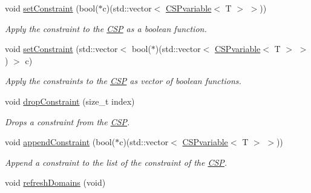 \begin{DoxyCompactItemize}
void \hyperlink{classCSP_a534a0d9bd10fb544f94196bf3c386657}{setConstraint} (bool($\ast$c)(std::vector$<$ \hyperlink{structCSPvariable}{CSPvariable}$<$ T $>$ $>$))
\begin{DoxyCompactList}\small\item\em Apply the constraint to the \hyperlink{classCSP}{CSP} as a boolean function. \item\end{DoxyCompactList}\item 
void \hyperlink{classCSP_a457e1df05d4ec16be00118bda22fd882}{setConstraint} (std::vector$<$ bool($\ast$)(std::vector$<$ \hyperlink{structCSPvariable}{CSPvariable}$<$ T $>$ $>$) $>$ c)
\begin{DoxyCompactList}\small\item\em Apply the constraints to the \hyperlink{classCSP}{CSP} as vector of boolean functions. \item\end{DoxyCompactList}\item 
void \hyperlink{classCSP_a0231b93bceae257f0e1c35041f8fe63f}{dropConstraint} (size\_\-t index)
\begin{DoxyCompactList}\small\item\em Drops a constraint from the \hyperlink{classCSP}{CSP}. \item\end{DoxyCompactList}\item 
void \hyperlink{classCSP_a8dc6aec6ca7e40d198e58b0ec14fee66}{appendConstraint} (bool($\ast$c)(std::vector$<$ \hyperlink{structCSPvariable}{CSPvariable}$<$ T $>$ $>$))
\begin{DoxyCompactList}\small\item\em Append a constraint to the list of the constraint of the \hyperlink{classCSP}{CSP}. \item\end{DoxyCompactList}\item 
\hypertarget{classCSP_a466845256e638c5e258fd728b641359f}{
void \hyperlink{classCSP_a466845256e638c5e258fd728b641359f}{refreshDomains} (void)}
\label{classCSP_a466845256e638c5e258fd728b641359f}


\end{DoxyCompactItemize}
